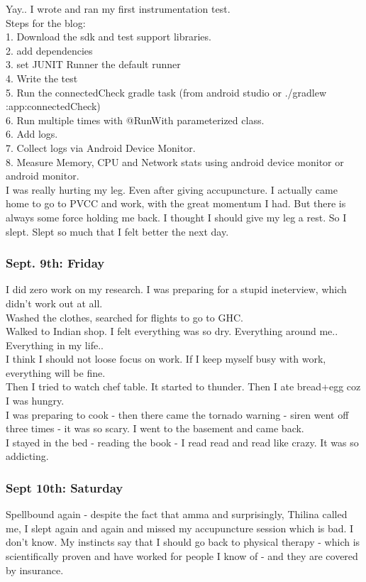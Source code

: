 \documentclass[11pt]{article}
\begin{document}
Yay.. I wrote and ran my first instrumentation test.\\
Steps for the blog:\\
1. Download the sdk and test support libraries.\\
2. add dependencies\\
3. set JUNIT Runner the default runner\\
4. Write the test\\
5. Run the connectedCheck gradle task (from android studio or ./gradlew :app:connectedCheck)\\
6. Run multiple times with @RunWith parameterized class.\\
6. Add logs.\\
7. Collect logs via Android Device Monitor.\\
8. Measure Memory, CPU and Network stats using android device monitor or android monitor.\\

I was really hurting my leg. Even after giving accupuncture. I actually came home to go to PVCC and work, with the great momentum I had. But there is 
always some force holding me back. I thought I should give my leg a rest. So I slept. Slept so much that I felt better the next day.

\subsubsection*{Sept. 9th: Friday}
I did zero work on my research. I was preparing for a stupid ineterview, which didn't work out at all.\\
Washed the clothes, searched for flights to go to GHC.\\
Walked to Indian shop. I felt everything was so dry. Everything around me.. Everything in my life..\\
I think I should not loose focus on work. If I keep myself busy with work, everything will be fine.\\
Then I tried to watch chef table. It started to thunder. Then I ate bread+egg coz I was hungry.\\
I was preparing to cook - then there came the tornado warning - siren went off three times - it was so scary. I went to the basement and came back.\\
I stayed in the bed - reading the book - I read read and read like crazy. It was so addicting.\\

\subsubsection*{Sept 10th: Saturday}
Spellbound again - despite the fact that amma and surprisingly, Thilina called me, I slept again and again and missed my accupuncture session which 
is bad. I don't know. My instincts say that I should go back to physical therapy - which is scientifically proven and have worked for people I know 
of - and they are covered by insurance.\\
\end{document}
